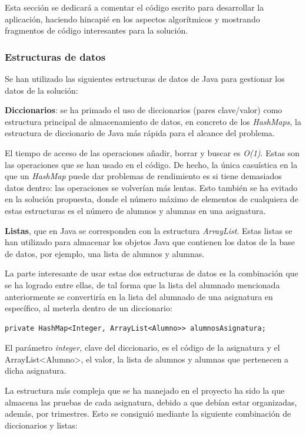 Esta sección se dedicará a comentar el código escrito para desarrollar la aplicación, haciendo hincapié en los aspectos algorítmicos y mostrando fragmentos de código interesantes para la solución.

\subsubsection{Estructuras de datos}
Se han utilizado las siguientes estructuras de datos de Java para gestionar los datos de la solución:

\textbf{Diccionarios}: se ha primado el uso de diccionarios (pares clave/valor) como estructura principal de almacenamiento de datos, en concreto de los \textit{HashMaps}, la estructura de diccionario de Java más rápida para el alcance del problema\cite{hashmap}.

El tiempo de acceso de las operaciones añadir, borrar y buscar es \textit{O(1)}. Estas son las operaciones que se han usado en el código. De hecho, la única casuística en la que un \textit{HashMap} puede dar problemas de rendimiento es si tiene demasiados datos dentro: las operaciones se volverían más lentas. Esto también se ha evitado en la solución propuesta, donde el número máximo de elementos de cualquiera de estas estructuras es el número de alumnos y alumnas en una asignatura.

\textbf{Listas}, que en Java se corresponden con la estructura \textit{ArrayList}. Estas listas se han utilizado para almacenar los objetos Java que contienen los datos de la base de datos, por ejemplo, una lista de alumnos y alumnas.

La parte interesante de usar estas dos estructuras de datos es la combinación que se ha logrado entre ellas, de tal forma que la lista del alumnado mencionada anteriormente se convertiría en la lista del alumnado de una asignatura en específico, al meterla dentro de un diccionario:
 
\begin{lstlisting}
private HashMap<Integer, ArrayList<Alumno>> alumnosAsignatura;
\end{lstlisting}

El parámetro \textit{integer}, clave del diccionario, es el código de la asignatura y el ArrayList<Alumno>, el valor, la lista de alumnos y alumnas que pertenecen a dicha asignatura.

La estructura más compleja que se ha manejado en el proyecto ha sido la que almacena las pruebas de cada asignatura, debido a que debían estar organizadas, además, por trimestres. Esto se consiguió mediante la siguiente combinación de diccionarios y listas:

